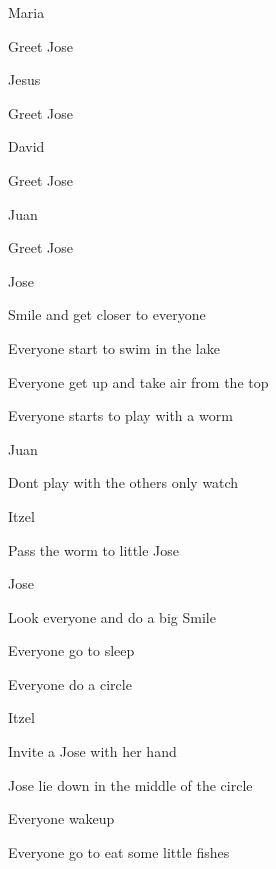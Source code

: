 \documentclass{screenplay}[2012/06/30]
\begin{document}
\begin{dialogue}[amazed]{Maria}
\end{dialogue}

Greet Jose

\begin{dialogue}[impressed]{Jesus}
\end{dialogue}

Greet Jose

\begin{dialogue}[scared]{David}
\end{dialogue}

Greet Jose

\begin{dialogue}[disgusted]{Juan}
\end{dialogue}

Greet Jose

\begin{dialogue}{Jose}
\end{dialogue}

Smile and get closer to everyone

Everyone start to swim in the lake

Everyone get up and take air from the top

Everyone starts to play with a worm

\begin{dialogue}[disgusted]{Juan}
\end{dialogue}

Dont play with the others only watch

\begin{dialogue}[happy]{Itzel}
\end{dialogue}

Pass the worm to little Jose

\begin{dialogue}{Jose}
\end{dialogue}

Look everyone and do a big Smile

Everyone go to sleep

Everyone do a circle

\begin{dialogue}{Itzel}
\end{dialogue}

Invite a Jose with her hand

Jose lie down in the middle of the circle

Everyone wakeup

Everyone go to eat some little fishes
\end{document}
